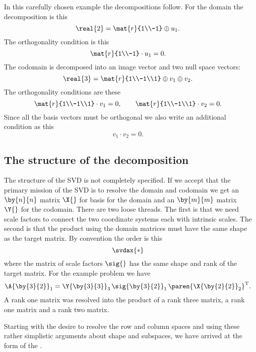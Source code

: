 In this carefully chosen example the decompositions follow. For the domain the decomposition is this
\begin{equation}
    \real{2}=\mat{r}{1\\-1}\oplus u_{1}.
\end{equation}
The orthogonality condition is this
\begin{equation}
  \mat{r}{1\\-1}\cdot u_{1}=0.
\end{equation}
The codomain is decomposed into an image vector and two null space vectors:
\begin{equation}
  \real{3}=\mat{r}{1\\-1\\1}\oplus v_{1}\oplus v_{2}.
\end{equation}
The orthogonality conditions are these
\begin{equation}
    \mat{r}{1\\-1\\1}\cdot v_{1}=0,\qquad \mat{r}{1\\-1\\1}\cdot v_{2}=0.
\end{equation}
Since all the basis vectors must be orthogonal we also write an additional condition as this
\begin{equation}
  v_{1}\cdot v_{2} = 0.
\end{equation}

\subsection{The structure of the decomposition}
The structure of the SVD is not completely specified. If we accept that the primary mission of the SVD is to resolve the domain and codomain we get an $\by{n}{n}$ matrix $\X{}$ for basis for the domain and an $\by{m}{m}$ matrix $\Y{}$ for the codomain. There are two loose threads. The first is that we need scale factors to connect the two coordinate systems each with intrinsic scales. The second is that the product using the domain matrices must have the same shape as the target matrix. By convention the order is this
\begin{equation}
  \svdax{*}
\end{equation}
where the matrix of scale factors $\sig{}$ has the same shape and rank of the target matrix. For the example problem we have
\begin{equation}
  \A{\by{3}{2}}_{1}=\Y{\by{3}{3}}_{3}\,\sig{\by{3}{2}}_{1}\,\paren{\X{\by{2}{2}}_{2}}^{\mathrm{T}}.
\end{equation}
A rank one matrix was resolved into the product of a rank three matrix, a rank one matrix and a rank two matrix.

Starting with the desire to resolve the row and column spaces and using these rather simplistic arguments about shape and subspaces, we have arrived at the form of the \svdl.


\endinput